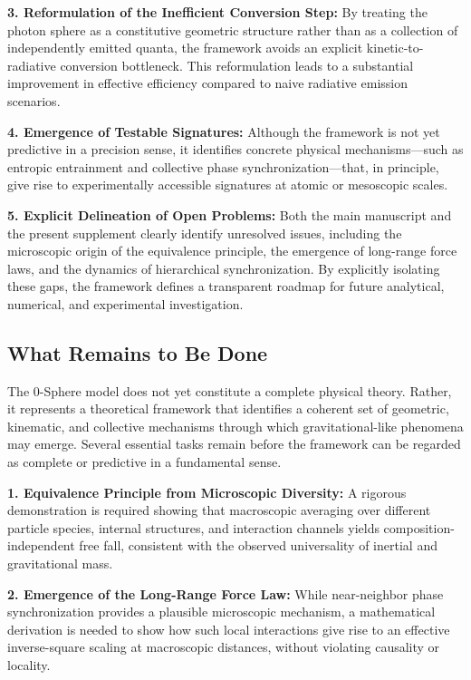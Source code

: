 \documentclass[12pt,letterpaper]{article}
\begin{document}
\textbf{3. Reformulation of the Inefficient Conversion Step:} By treating the photon sphere as a constitutive geometric structure rather than as a collection of independently emitted quanta, the framework avoids an explicit kinetic-to-radiative conversion bottleneck. This reformulation leads to a substantial improvement in effective efficiency compared to naive radiative emission scenarios.

\textbf{4. Emergence of Testable Signatures:} Although the framework is not yet predictive in a precision sense, it identifies concrete physical mechanisms—such as entropic entrainment and collective phase synchronization—that, in principle, give rise to experimentally accessible signatures at atomic or mesoscopic scales.

\textbf{5. Explicit Delineation of Open Problems:} Both the main manuscript and the present supplement clearly identify unresolved issues, including the microscopic origin of the equivalence principle, the emergence of long-range force laws, and the dynamics of hierarchical synchronization. By explicitly isolating these gaps, the framework defines a transparent roadmap for future analytical, numerical, and experimental investigation.


\subsection{What Remains to Be Done}
\label{subsec:remaining}

The 0-Sphere model does not yet constitute a complete physical theory. Rather, it represents a theoretical framework that identifies a coherent set of geometric, kinematic, and collective mechanisms through which gravitational-like phenomena may emerge. Several essential tasks remain before the framework can be regarded as complete or predictive in a fundamental sense.

\textbf{1. Equivalence Principle from Microscopic Diversity:} A rigorous demonstration is required showing that macroscopic averaging over different particle species, internal structures, and interaction channels yields composition-independent free fall, consistent with the observed universality of inertial and gravitational mass.

\textbf{2. Emergence of the Long-Range Force Law:} While near-neighbor phase synchronization provides a plausible microscopic mechanism, a mathematical derivation is needed to show how such local interactions give rise to an effective inverse-square scaling at macroscopic distances, without violating causality or locality.
\end{document}
